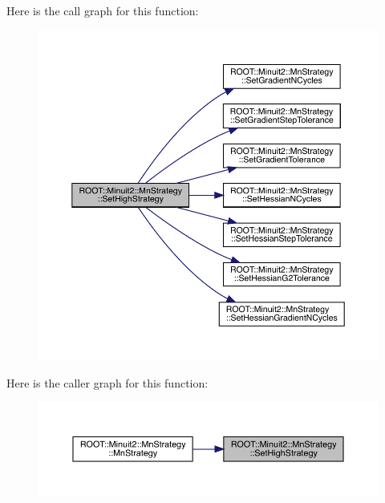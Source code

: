 Here is the call graph for this function\+:\nopagebreak
\begin{figure}[H]
\begin{center}
\leavevmode
\includegraphics[width=350pt]{da/de4/classROOT_1_1Minuit2_1_1MnStrategy_a92e5deb2087eec6e0d7db5d5789f3a06_cgraph}
\end{center}
\end{figure}
Here is the caller graph for this function\+:\nopagebreak
\begin{figure}[H]
\begin{center}
\leavevmode
\includegraphics[width=350pt]{da/de4/classROOT_1_1Minuit2_1_1MnStrategy_a92e5deb2087eec6e0d7db5d5789f3a06_icgraph}
\end{center}
\end{figure}
\mbox{\label{classROOT_1_1Minuit2_1_1MnStrategy_a24671e2ae8a1224583adfcb3fb73ad55}} 
